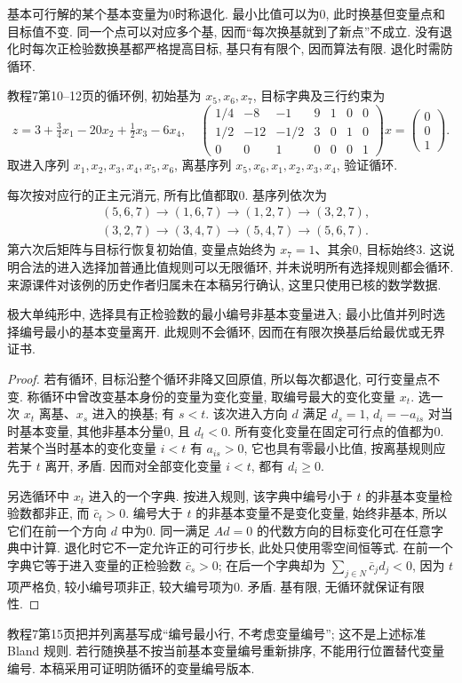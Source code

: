 基本可行解的某个基本变量为0时称退化. 最小比值可以为0, 此时换基但变量点和目标值不变. 同一个点可以对应多个基, 因而“每次换基就到了新点”不成立. 没有退化时每次正检验数换基都严格提高目标, 基只有有限个, 因而算法有限. 退化时需防循环.

\begin{example}
\label{ex:lp-cycle}
教程7第10--12页的循环例, 初始基为 $x_5,x_6,x_7$, 目标字典及三行约束为
\[
z=3+\tfrac34x_1-20x_2+\tfrac12x_3-6x_4,
\quad
\begin{pmatrix}
1/4&-8&-1&9&1&0&0\\
1/2&-12&-1/2&3&0&1&0\\
0&0&1&0&0&0&1
\end{pmatrix}x=\begin{pmatrix}0\\0\\1\end{pmatrix}.
\]
取进入序列 $x_1,x_2,x_3,x_4,x_5,x_6$, 离基序列 $x_5,x_6,x_1,x_2,x_3,x_4$, 验证循环.
\end{example}
\begin{solution}
每次按对应行的正主元消元, 所有比值都取0. 基序列依次为
\[
\begin{aligned}
&(5,6,7)\to(1,6,7)\to(1,2,7)\to(3,2,7),\\
&(3,2,7)\to(3,4,7)\to(5,4,7)\to(5,6,7).
\end{aligned}
\]
 第六次后矩阵与目标行恢复初始值, 变量点始终为 $x_7=1$、其余0, 目标始终3. 这说明合法的进入选择加普通比值规则可以无限循环, 并未说明所有选择规则都会循环. 来源课件对该例的历史作者归属未在本稿另行确认, 这里只使用已核的数学数据.
\end{solution}

\begin{theorem}
极大单纯形中, 选择具有正检验数的最小编号非基本变量进入; 最小比值并列时选择编号最小的基本变量离开. 此规则不会循环, 因而在有限次换基后给最优或无界证书.
\end{theorem}
\begin{proof}
若有循环, 目标沿整个循环非降又回原值, 所以每次都退化, 可行变量点不变. 称循环中曾改变基本身份的变量为变化变量, 取编号最大的变化变量 $x_t$. 选一次 $x_t$ 离基、$x_s$ 进入的换基; 有 $s<t$. 该次进入方向 $d$ 满足 $d_s=1$, $d_i=-a_{is}$ 对当时基本变量, 其他非基本分量0, 且 $d_t<0$. 所有变化变量在固定可行点的值都为0. 若某个当时基本的变化变量 $i<t$ 有 $a_{is}>0$, 它也具有零最小比值, 按离基规则应先于 $t$ 离开, 矛盾. 因而对全部变化变量 $i<t$, 都有 $d_i\ge0$.

另选循环中 $x_t$ 进入的一个字典. 按进入规则, 该字典中编号小于 $t$ 的非基本变量检验数都非正, 而 $\bar c_t>0$. 编号大于 $t$ 的非基本变量不是变化变量, 始终非基本, 所以它们在前一个方向 $d$ 中为0. 同一满足 $Ad=0$ 的代数方向的目标变化可在任意字典中计算. 退化时它不一定允许正的可行步长, 此处只使用零空间恒等式. 在前一个字典它等于进入变量的正检验数 $\bar c_s>0$; 在后一个字典却为 $\sum_{j\in N}\bar c_jd_j<0$, 因为 $t$ 项严格负, 较小编号项非正, 较大编号项为0. 矛盾. 基有限, 无循环就保证有限性.
\end{proof}
教程7第15页把并列离基写成“编号最小行, 不考虑变量编号”; 这不是上述标准 Bland 规则. 若行随换基不按当前基本变量编号重新排序, 不能用行位置替代变量编号. 本稿采用可证明防循环的变量编号版本.

